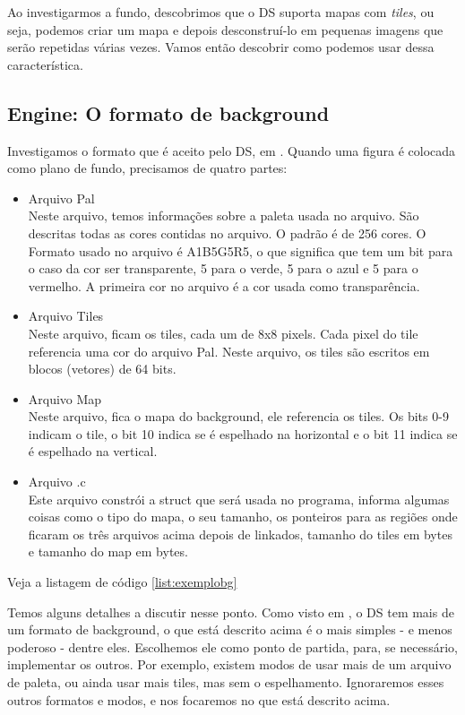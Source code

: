 \documentclass[brazil]{abnt}
\begin{document}
Ao investigarmos a fundo, descobrimos que o DS suporta mapas com \textit{tiles}, ou seja, podemos criar um mapa e depois desconstruí-lo em pequenas imagens que serão repetidas várias vezes. Vamos então descobrir como podemos usar dessa característica. 

\subsection{Engine: O formato de background}

Investigamos o formato que é aceito pelo DS, em \cite{DSSpec}. Quando uma figura é colocada como plano de fundo, precisamos de quatro partes:

\begin{itemize}
 \item Arquivo Pal\\
 Neste arquivo, temos informações sobre a paleta usada no arquivo. São descritas todas as cores contidas no arquivo. O padrão é de 256 cores. O Formato usado no arquivo é A1B5G5R5, o que significa que tem um bit para o caso da cor ser transparente, 5 para o verde, 5 para o azul e 5 para o vermelho. A primeira cor no arquivo é a cor usada como transparência.
 \item Arquivo Tiles\\
 Neste arquivo, ficam os tiles, cada um de 8x8 pixels. Cada pixel do tile referencia uma cor do arquivo Pal. Neste arquivo, os tiles são escritos em blocos (vetores) de 64 bits. 
 \item Arquivo Map\\
 Neste arquivo, fica o mapa do background, ele referencia os tiles. Os bits 0-9 indicam o tile, o bit 10 indica se é espelhado na horizontal e o bit 11 indica se é espelhado na vertical.
 \item Arquivo .c\\
 Este arquivo constrói a struct que será usada no programa, informa algumas coisas como o tipo do mapa, o seu tamanho, os ponteiros para as regiões onde ficaram os três arquivos acima depois de linkados, tamanho do tiles em bytes e tamanho do map em bytes. 
\end{itemize}

Veja a listagem de código \ref{list:exemplobg}

Temos alguns detalhes a discutir nesse ponto. Como visto em \cite{DSSpec}, o DS tem mais de um formato de background, o que está descrito acima é o mais simples - e menos poderoso - dentre eles. Escolhemos ele como ponto de partida, para, se necessário, implementar os outros. Por exemplo, existem modos de usar mais de um arquivo de paleta, ou ainda usar mais tiles, mas sem o espelhamento. Ignoraremos esses outros formatos e modos, e nos focaremos no que está descrito acima.
\end{document}
